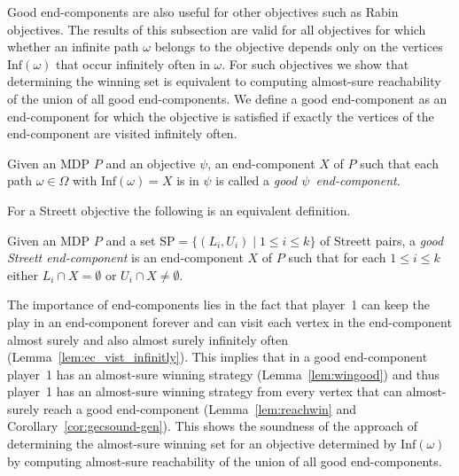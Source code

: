 \documentclass[11pt,letterpaper]{article}
\newcommand{\Inf}{\mathrm{Inf}}
\newcommand{\SP}{\mathrm{SP}}
\newcommand{\pat}{\omega\xspace}
\newcommand{\Path}{\Omega\xspace}
\newcommand{\obj}{\psi\xspace}
\newcommand{\mdp}{P\xspace}
\newcommand{\ec}{X\xspace}
\begin{document}
Good end-components are also useful for other objectives such as Rabin objectives.
The results of this subsection are valid for all objectives for which whether
an infinite path $\pat$ belongs to the objective depends only on the vertices
$\Inf(\pat)$ that occur infinitely often in $\pat$.
For such objectives we show that determining the winning set is equivalent to 
computing almost-sure reachability of the union of all good end-components.
We define a good end-component as an end-component for which the objective
is satisfied if exactly the vertices of the end-component are visited infinitely
often.
\begin{definition}\label{def:good_ec}
  Given an MDP $\mdp$ and an objective $\obj$,
  an end-component $\ec$ of $\mdp$ such that
  each path $\pat \in \Path$ with $\Inf(\omega)=\ec$ is in $\obj$
  is called a \emph{good $\obj$~end-component}.
\end{definition}
For a Streett objective the following is an equivalent definition.
\begin{definition}
	Given an MDP $\mdp$ and a set $\SP= \{(L_i, U_i) \mid 1 \le i \le k\}$ of
	Streett pairs, 
	a \emph{good Streett end-component} is an end-component $\ec$ of $\mdp$ such that
	for each $1 \le i \le k$ either $L_i \cap \ec = \emptyset$ or
	$U_i \cap \ec \ne \emptyset$.
\end{definition}

The importance of end-components lies in the fact that player~1 can keep the play
in an end-component forever and can visit each vertex in the end-component
almost surely and also almost surely infinitely often
(Lemma~\ref{lem:ec_vist_infinitly}). This implies that in a good end-component
player~1 has an almost-sure winning strategy (Lemma~\ref{lem:wingood}) and thus
player~1 has an almost-sure winning strategy from every vertex that can 
almost-surely reach a good end-component (Lemma~\ref{lem:reachwin} and 
Corollary~\ref{cor:gecsound-gen}). This shows the soundness of the approach
of determining the almost-sure winning set for an objective determined by 
$\Inf(\pat)$ by computing almost-sure reachability of the union of all good
end-components.
\end{document}
